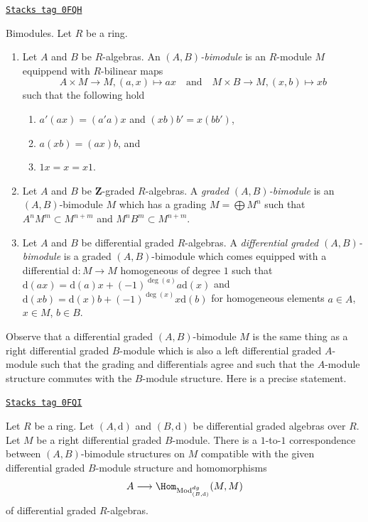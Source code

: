 \begin{definition}[Bimodule]
\label{dga-definition-bimodule}
\href{https://stacks.math.columbia.edu/tag/0FQH}{\texttt{Stacks tag 0FQH}}

Bimodules. Let $R$ be a ring.
\begin{enumerate}
\item Let $A$ and $B$ be $R$-algebras. An {\it $(A, B)$-bimodule}
is an $R$-module $M$ equippend with $R$-bilinear maps
$$
A \times M \to M, (a, x) \mapsto ax
\quad\text{and}\quad
M \times B \to M, (x, b) \mapsto xb
$$
such that the following hold
\begin{enumerate}
\item $a'(ax) = (a'a)x$ and $(xb)b' = x(bb')$,
\item $a(xb) = (ax)b$, and
\item $1 x = x = x 1$.
\end{enumerate}
\item Let $A$ and $B$ be $\mathbf{Z}$-graded $R$-algebras. A
{\it graded $(A, B)$-bimodule} is an $(A, B)$-bimodule $M$ which
has a grading $M = \bigoplus M^n$ such that
$A^n M^m \subset M^{n + m}$ and $M^n B^m \subset M^{n + m}$.
\item Let $A$ and $B$ be differential graded $R$-algebras. A
{\it differential graded $(A, B)$-bimodule} is a graded $(A, B)$-bimodule
which comes equipped with a differential
$\text{d} : M \to M$ homogeneous of degree $1$
such that $\text{d}(ax) = \text{d}(a)x + (-1)^{\deg(a)}a\text{d}(x)$ and
$\text{d}(xb) = \text{d}(x)b + (-1)^{\deg(x)}x\text{d}(b)$
for homogeneous elements $a \in A$, $x \in M$, $b \in B$.
\end{enumerate}
\end{definition}

Observe that a differential graded $(A, B)$-bimodule
$M$ is the same thing as a right differential graded
$B$-module which is also a left differential graded
$A$-module such that the grading and differentials agree
and such that the $A$-module structure commutes with
the $B$-module structure. Here is a precise statement.

\begin{lemma}
\label{dga-lemma-what-makes-a-bimodule-dg}
\href{https://stacks.math.columbia.edu/tag/0FQI}{\texttt{Stacks tag 0FQI}}

Let $R$ be a ring. Let $(A, \text{d})$ and $(B, \text{d})$ be
differential graded algebras over $R$. Let $M$ be a right differential
graded $B$-module. There is a $1$-to-$1$ correspondence
between $(A, B)$-bimodule structures on $M$ compatible with the given
differential graded $B$-module structure and homomorphisms
$$
A
\longrightarrow
\Hom_{\text{Mod}^{dg}_{(B, \text{d})}}(M, M)
$$
of differential graded $R$-algebras.
\end{lemma}

